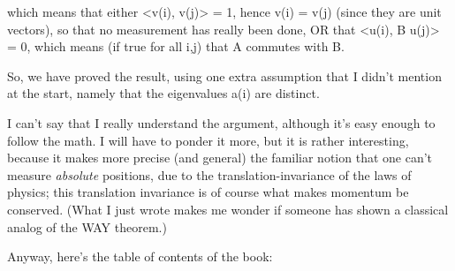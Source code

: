 which means that either <v(i), v(j)> = 1, hence v(i) = v(j)
(since they are unit vectors), so that no measurement has
really been done, OR that <u(i), B u(j)> = 0, which means (if true for
all i,j) that A commutes with B.

So, we have proved the result, using one extra assumption that I didn't
mention at the start, namely that the eigenvalues a(i) are distinct.  

I can't say that I really understand the argument, although it's easy
enough to follow the math.  I will have to ponder it more, but it is
rather interesting, because it makes more precise (and general) the familiar
notion that one can't measure \emph{absolute} positions, due to the
translation-invariance of the laws of physics; this translation
invariance is of course what makes momentum be conserved.  (What I just
wrote makes me wonder if someone has shown a classical analog of the WAY
theorem.)

Anyway, here's the table of contents of the book:


